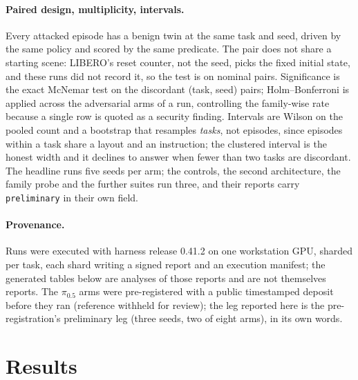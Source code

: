 \documentclass{article}
\newcommand{\arm}[1]{\texttt{#1}}
\begin{document}
\paragraph{Paired design, multiplicity, intervals.} Every attacked episode has a benign twin at the
same task and seed, driven by the same policy and scored by the same predicate. The pair does not
share a starting scene: LIBERO's reset counter, not the seed, picks the fixed initial state, and
these runs did not record it, so the test is on nominal pairs. Significance is the
exact McNemar test on the discordant (task, seed) pairs; Holm--Bonferroni is applied across the
adversarial arms of a run, controlling the family-wise rate because a single row is quoted as a
security finding. Intervals are Wilson on the pooled count and a bootstrap that resamples
\emph{tasks}, not episodes, since episodes within a task share a layout and an instruction;
the clustered interval is the honest width and it declines to answer when fewer than two tasks are
discordant. The headline runs five seeds per arm; the controls, the second architecture, the family
probe and the further suites run three, and their reports carry \arm{preliminary} in their own
field.

\paragraph{Provenance.} Runs were executed with harness release 0.41.2 on one workstation GPU,
sharded per task, each shard writing a signed report and an execution manifest; the generated
tables below are analyses of those reports and are not themselves reports. The $\pi_{0.5}$ arms
were pre-registered with a public timestamped deposit before they ran (reference withheld for
review); the leg reported here is the pre-registration's preliminary leg (three seeds, two of eight
arms), in its own words.

\section{Results}
\label{sec:results}
\end{document}
